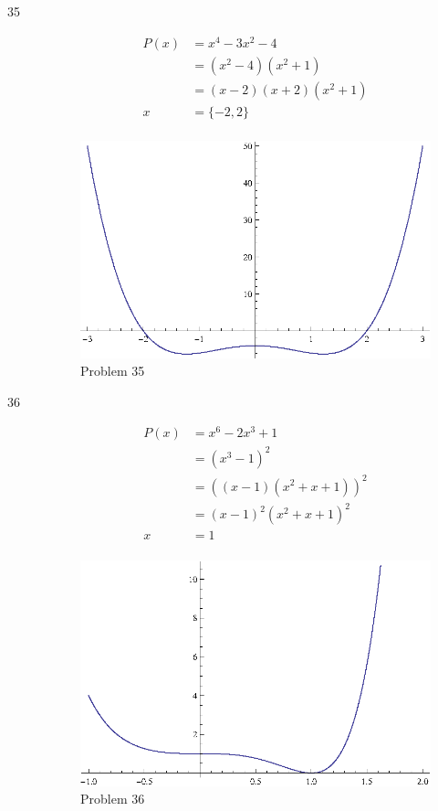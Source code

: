 \documentclass{exam}
\begin{document}
\begin{description}
    \item[35] 
      \begin{align*}
        P(x) &= x^4 - 3x^2 - 4 \\
             &= (x^2 - 4)(x^2 + 1) \\
             &= (x - 2)(x + 2)(x^2 + 1) \\
        x    &= \{-2, 2 \} \\
      \end{align*}
      
      \begin{figure}[H]
        \centering
        \includegraphics[scale=0.9]{problem35.eps}
        \caption*{Problem 35}
      \end{figure}

    \item[36] 
      \begin{align*}
        P(x) &= x^6 - 2x^3 + 1 \\
             &= (x^3 - 1)^2 \\
             &= ((x - 1)(x^2 + x + 1))^2 \\
             &= (x - 1)^2 (x^2 + x + 1)^2 \\
        x    &= 1 \\
      \end{align*}
      
      \begin{figure}[H]
        \centering
        \includegraphics[scale=0.9]{problem36.eps}
        \caption*{Problem 36}
      \end{figure}

  \end{description}
\end{document}
